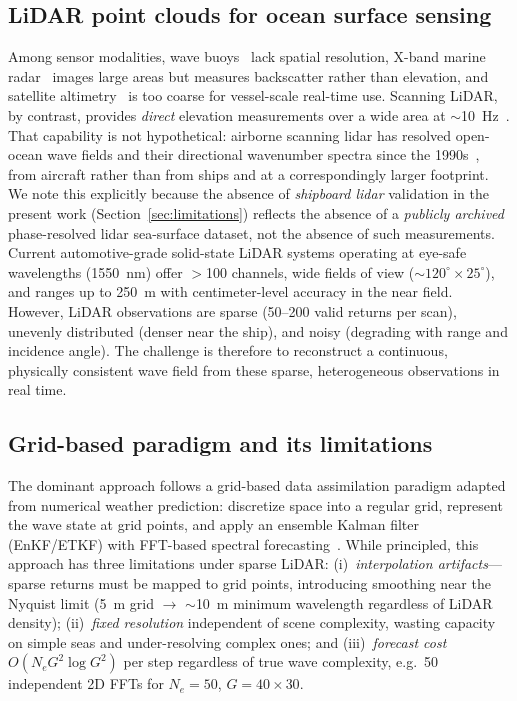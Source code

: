 \documentclass[review]{elsarticle}
\begin{document}
\subsection{LiDAR point clouds for ocean surface sensing}

Among sensor modalities, wave buoys~\citep{datawell2009} lack
spatial resolution, X-band marine radar~\citep{nieto2004, young1985}
images large areas but measures backscatter rather than elevation,
and satellite altimetry~\citep{queffeulou2004} is too coarse for
vessel-scale real-time use.  Scanning LiDAR, by contrast,
provides \emph{direct} elevation measurements over a wide area at
$\sim$10~Hz~\citep{belmont2008}.
That capability is not hypothetical: airborne scanning lidar has resolved
open-ocean wave fields and their directional wavenumber spectra since the
1990s~\citep{hwang2000}, from aircraft rather than from ships and at a
correspondingly larger footprint.  We note this explicitly because the
absence of \emph{shipboard lidar} validation in the present work
(Section~\ref{sec:limitations}) reflects the absence of a \emph{publicly
archived} phase-resolved lidar sea-surface dataset, not the absence of
such measurements.
Current automotive-grade solid-state LiDAR systems operating at eye-safe wavelengths
(1550~nm) offer $>$100 channels, wide fields of view
($\sim$$120^\circ \times 25^\circ$), and ranges up to 250~m with
centimeter-level accuracy in the near field.  However, LiDAR observations are sparse
(50--200 valid returns per scan), unevenly distributed (denser near
the ship), and noisy (degrading with range and incidence angle).
The challenge is therefore to reconstruct a continuous, physically
consistent wave field from these sparse, heterogeneous observations
in real time.

\subsection{Grid-based paradigm and its limitations}

The dominant approach follows a grid-based data assimilation
paradigm adapted from numerical weather prediction: discretize space
into a regular grid, represent the wave state at grid points, and
apply an ensemble Kalman filter (EnKF/ETKF) with FFT-based spectral
forecasting~\citep{desmars2020, desmars2023jfm, evensen2003}.
While principled, this approach has three limitations under sparse
LiDAR: (i)~\emph{interpolation artifacts}---sparse returns must be
mapped to grid points, introducing smoothing near the Nyquist limit
(5~m grid $\to$ $\sim$10~m minimum wavelength regardless of LiDAR
density); (ii)~\emph{fixed resolution} independent of scene
complexity, wasting capacity on simple seas and under-resolving
complex ones; and (iii)~\emph{forecast cost}
$O(N_e G^2\log G^2)$ per step regardless of true wave complexity,
e.g.\ 50 independent 2D FFTs for $N_e{=}50$, $G{=}40{\times}30$.
\end{document}
